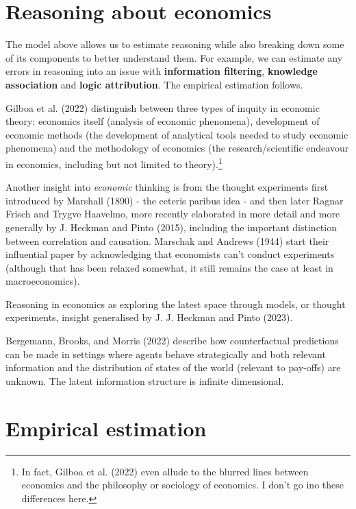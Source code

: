 \documentclass[
]{article}
\begin{document}
\section{Reasoning about economics}\label{reasoning-about-economics}

The model above allows us to estimate reasoning while also breaking down
some of its components to better understand them. For example, we can
estimate any errors in reasoning into an issue with \textbf{information
filtering}, \textbf{knowledge association} and \textbf{logic
attribution}. The empirical estimation follows.

Gilboa et al. (2022) distinguish between three types of inquity in
economic theory: economics itself (analysis of economic phenomena),
development of economic methods (the development of analytical tools
needed to study economic phenomena) and the methodology of economics
(the research/scientific endeavour in economics, including but not
limited to theory).\footnote{In fact, Gilboa et al. (2022) even allude
  to the blurred lines between economics and the philosophy or sociology
  of economics. I don't go ino these differences here.}

Another insight into \emph{economic} thinking is from the thought
experiments first introduced by Marshall (1890) - the ceteris paribus
idea - and then later Ragnar Frisch and Trygve Haavelmo, more recently
elaborated in more detail and more generally by J. Heckman and Pinto
(2015), including the important distinction between correlation and
causation. Marschak and Andrews (1944) start their influential paper by
acknowledging that economists can't conduct experiments (although that
has been relaxed somewhat, it still remains the case at least in
macroeconomics).

Reasoning in economics as exploring the latest space through models, or
thought experiments, insight generalised by J. J. Heckman and Pinto
(2023).

Bergemann, Brooks, and Morris (2022) describe how counterfactual
predictions can be made in settings where agents behave strategically
and both relevant information and the distribution of states of the
world (relevant to pay-offs) are unknown. The latent information
structure is infinite dimensional.

\section{Empirical estimation}\label{empirical-estimation}
\end{document}
